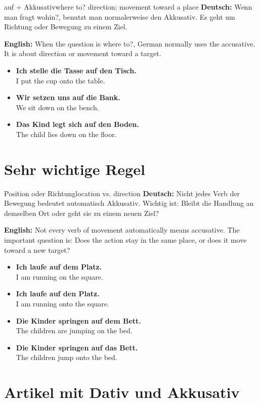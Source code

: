 \documentclass[a4paper,11pt]{article}
\newcommand{\GermanText}[1]{\textbf{Deutsch: }#1\par}
\newcommand{\EnglishText}[1]{{\small\color{SoftGray}\textbf{English: }#1\par}}
\newcommand{\ExampleItem}[2]{\item \textbf{#1}\\{\small\color{SoftGray}#2}}
\begin{document}
    \begin{grammarentry}{auf + Akkusativ}{where to? direction; movement toward a place}
        \GermanText{Wenn man fragt \glqq wohin?\grqq, benutzt man normalerweise den Akkusativ. Es geht um Richtung oder Bewegung zu einem Ziel.}
        \EnglishText{When the question is \glqq where to?\grqq, German normally uses the accusative. It is about direction or movement toward a target.}

        \begin{exbox}
            \begin{itemize}
                \ExampleItem{Ich stelle die Tasse auf den Tisch.}{I put the cup onto the table.}
                \ExampleItem{Wir setzen uns auf die Bank.}{We sit down on the bench.}
                \ExampleItem{Das Kind legt sich auf den Boden.}{The child lies down on the floor.}
            \end{itemize}
        \end{exbox}
    \end{grammarentry}

    \section{Sehr wichtige Regel}

    \begin{grammarentry}{Position oder Richtung}{location vs. direction}
        \GermanText{Nicht jedes Verb der Bewegung bedeutet automatisch Akkusativ. Wichtig ist: Bleibt die Handlung an demselben Ort oder geht sie zu einem neuen Ziel?}
        \EnglishText{Not every verb of movement automatically means accusative. The important question is: Does the action stay in the same place, or does it move toward a new target?}

        \begin{exbox}
            \begin{itemize}
                \ExampleItem{Ich laufe auf dem Platz.}{I am running on the square.}
                \ExampleItem{Ich laufe auf den Platz.}{I am running onto the square.}
                \ExampleItem{Die Kinder springen auf dem Bett.}{The children are jumping on the bed.}
                \ExampleItem{Die Kinder springen auf das Bett.}{The children jump onto the bed.}
            \end{itemize}
        \end{exbox}
    \end{grammarentry}

    \section{Artikel mit Dativ und Akkusativ}
\end{document}
